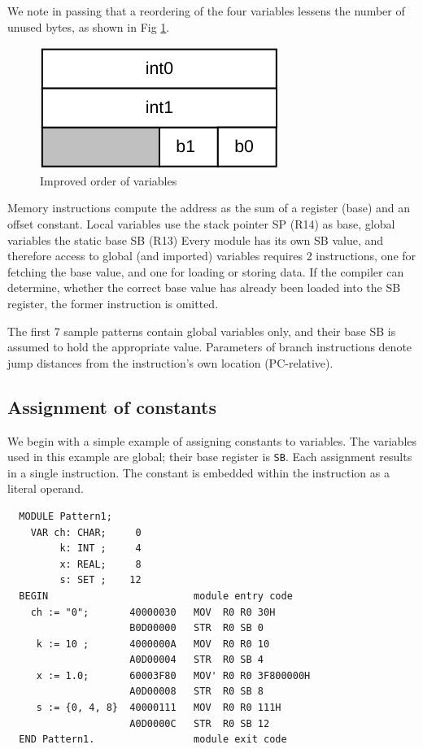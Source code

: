 We note in passing that a reordering of the four variables lessens the number of unused bytes, as
shown in Fig \ref{fig:varorder}.
\begin{figure}[h!]
  \centering
  \includegraphics[width=.25\textwidth]{i/C/3.png}
  \caption{Improved order of variables}
  \label{fig:varorder}
\end{figure}

Memory instructions compute the address as the sum of a register (base) and an offset constant.
Local variables use the stack pointer SP (R14) as base, global variables the static base SB (R13)
Every module has its own SB value, and therefore access to global (and imported) variables
requires 2 instructions, one for fetching the base value, and one for loading or storing data. If the
compiler can determine, whether the correct base value has already been loaded into the SB
register, the former instruction is omitted.

The first 7 sample patterns contain global variables only, and their base SB is assumed to hold the
appropriate value. Parameters of branch instructions denote jump distances from the instruction's
own location (PC-relative).

\subsection{Assignment of constants}
\label{ssc:ptn1}
We begin with a simple example of assigning constants to variables. The variables used in this example
are global; their base register is \verb|SB|. Each assignment results in a single instruction.
The constant is embedded within the instruction as a literal operand.
\begin{verbatim}
  MODULE Pattern1;
    VAR ch: CHAR;     0
         k: INT ;     4
         x: REAL;     8
         s: SET ;    12
  BEGIN                         module entry code    
    ch := "0";       40000030   MOV  R0 R0 30H
                     B0D00000   STR  R0 SB 0
     k := 10 ;       4000000A   MOV  R0 R0 10
                     A0D00004   STR  R0 SB 4
     x := 1.0;       60003F80   MOV' R0 R0 3F800000H
                     A0D00008   STR  R0 SB 8
     s := {0, 4, 8}  40000111   MOV  R0 R0 111H
                     A0D0000C   STR  R0 SB 12
  END Pattern1.                 module exit code
\end{verbatim}

